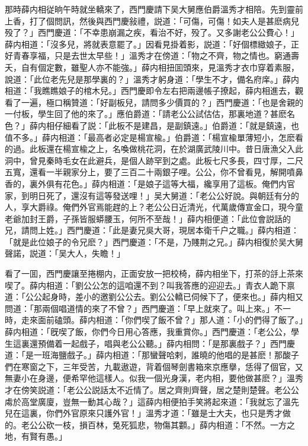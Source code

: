 那時薛内相従晌午時就坐轎來了，西門慶請下吴大舅應伯爵溫秀才相陪。先到靈前上香，打了個問訊，然後與西門慶敍禮，説道：「可傷，可傷！如夫人是甚麽病兒殁了？」西門慶道：「不幸患崩漏之疾，看治不好，殁了。又多謝老公公費心！」薛内相道：「沒多兒，將就表意罷了。」因看見掛着影，説道：「好個標緻娘子，正好青春享福，只是去世太早些！」溫秀才在傍道：「物之不齊，物之情也。窮通壽夭，自有個定數，雖聖人亦不能強。」薛内相扭囬頭來，見溫秀才衣巾穿着素服，說道：「此位老先兒是那學裏的？」溫秀才躬身道：「學生不才，備名府庠。」薛内相道：「我瞧瞧娘子的棺木兒。」西門慶即令左右把兩邊帳子撩起，薛内相進去，觀看了一遍，極口稱贊道：「好副板兒，請問多少價買的？」西門慶道：「也是舍親的一付板，學生回了他的來了。」應伯爵道：「請老公公試估估，那裏地道？甚麽名色？」薛内相仔細看了説：「此板不是建昌，是副鎮遠。」伯爵道：「就是鎮遠，也值不多。」薛内相道：「最高者必定是楊宣楡。」伯爵道：「楊宣楡單薄短小，怎麽看的過。此板還在楊宣楡之上，名喚做桃花洞，在於湖廣武陵川中。昔日唐漁父入此洞中，曾見秦時毛女在此避兵，是個人跡罕到之處。此板七尺多長，四寸厚，二尺五寬，還看一半親家分上，要了三百二十兩銀子哩。公公，你不曾看見，解開噴鼻香的，裏外俱有花色。」薛内相道：「是娘子這等大福，纔享用了這板。俺們内官家，到明日死了，還沒有這等發送哩！」吴大舅道：「老公公好說。與朝廷有分的人，享大爵祿。俺們外官焉能趕的上？老公公日近清光，代萬歲傳宣金口，現今童老爺加封王爵，子孫皆服蟒腰玉，何所不至哉！」薛内相便道：「此位會説話的兄，請問上姓。」西門慶道：「此是妻兄吳大哥，現居本衛千户之職。」薛内相道：「就是此位娘子的令兄麽？」西門慶道：「不是，乃賤荆之兄。」薛内相復於吴大舅聲諾，説道：「吴大人，失瞻！」

看了一囬，西門慶讓至捲棚内，正面安放一把校椅，薛内相坐下，打茶的㧱上茶來喫了。薛内相道：「劉公公怎的這咱還不到？叫我答應的迎迎去。」青衣人跪下禀道：「公公起身時，差小的邀劉公公去。劉公公轎已伺候下了，便來也。」薛内相又問道：「那兩個唱道情的來了不曾？」西門慶道：「早上就來了。叫上來。」不一時，走來面前磕頭。薛内相道：「你們喫了飯不曾？」那人道：「小的們得了飯了。」薛内相道：「旣喫了飯，你們今日用心答應，我重賞你。」西門慶道：「老公公，學生這裏還預備着一起戲子，唱與老公公聽。」薛内相問：「是那裏戲子？」西門慶道：「是一班海鹽戲子。」薛内相道：「那蠻聲哈剌，誰曉的他唱的是甚麽！那酸子們在寒窗之下，三年受苦，九載遨遊，背着個琴劍書箱來京應擧，恁得了個官，又無妻小在身邊，便希罕他這樣人。似我一個光身漢，老内相，要他做甚麽？」溫秀才在傍笑説道：「老公公説話太不近情了。居之齊則齊聲，居之楚則楚聲。老公公䖏於高堂廣廈，豈無一動其心哉？」這薛内相便拍手笑將起來道：「我就忘了溫先兒在這裏，你們外官原來只護外官！」溫秀才道：「雖是士大夫，也只是秀才做的。老公公砍一枝，損百林，兔死狐悲，物傷其䫫。」薛内相道：「不然。一方之地，有賢有愚。」

